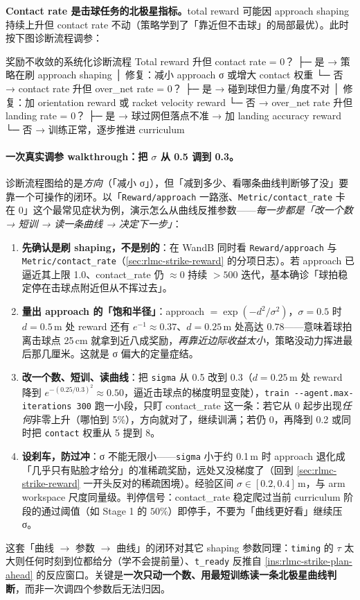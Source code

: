 \textbf{Contact rate 是击球任务的北极星指标。}total reward 可能因 approach shaping 持续上升但 contact rate 不动（策略学到了「靠近但不击球」的局部最优）。此时按下图诊断流程调参：

\begin{codebox}[text]{奖励不收敛的系统化诊断流程}
Total reward 升但 contact rate = 0？
  ├─ 是 → 策略在刷 approach shaping
  │        修复：减小 approach σ 或增大 contact 权重
  └─ 否 → contact rate 升但 over_net rate = 0？
           ├─ 是 → 碰到球但力量/角度不对
           │        修复：加 orientation reward 或 racket velocity reward
           └─ 否 → over_net rate 升但 landing rate = 0？
                    ├─ 是 → 球过网但落点不准 → 加 landing accuracy reward
                    └─ 否 → 训练正常，逐步推进 curriculum
\end{codebox}

\paragraph{一次真实调参 walkthrough：把 \texorpdfstring{$\sigma$}{sigma} 从 0.5 调到 0.3。}诊断流程图给的是\emph{方向}（「减小 σ」），但「减到多少、看哪条曲线判断够了没」要靠一个可操作的闭环。以「\verb|Reward/approach| 一路涨、\verb|Metric/contact_rate| 卡在 0」这个最常见症状为例，演示怎么从曲线反推参数——\emph{每一步都是「改一个数 → 短训 → 读一条曲线 → 决定下一步」}：
\begin{enumerate}
  \item \textbf{先确认是刷 shaping，不是别的}：在 WandB 同时看 \verb|Reward/approach| 与 \verb|Metric/contact_rate|（\cref{sec:rlmc-strike-reward} 的分项日志）。若 approach 已逼近其上限 1.0、contact\_rate 仍 $\approx 0$ 持续 $>500$ 迭代，基本确诊「球拍稳定停在击球点附近但从不挥过去」。
  \item \textbf{量出 approach 的「饱和半径」}：approach $=\exp(-d^2/\sigma^2)$，$\sigma=0.5$ 时 $d=0.5$\,m 处 reward 还有 $e^{-1}\approx0.37$、$d=0.25$\,m 处高达 $0.78$——意味着球拍离击球点 25\,cm 就拿到近八成奖励，\emph{再靠近边际收益太小}，策略没动力挥进最后那几厘米。这就是 σ 偏大的定量症结。
  \item \textbf{改一个数、短训、读曲线}：把 \verb|sigma| 从 0.5 改到 0.3（$d=0.25$\,m 处 reward 降到 $e^{-(0.25/0.3)^2}\approx0.50$，逼近击球点的梯度明显变陡），\verb|train --agent.max-iterations 300| 跑一小段，只盯 contact\_rate 这一条：若它从 0 起步出现\emph{任何}非零上升（哪怕到 5\%），方向就对了，继续训满；若仍 0，再降到 0.2 或同时把 \verb|contact| 权重从 5 提到 8。
  \item \textbf{设刹车，防过冲}：σ 不能无限小——\verb|sigma| 小于约 0.1\,m 时 approach 退化成「几乎只有贴脸才给分」的准稀疏奖励，远处又没梯度了（回到 \cref{sec:rlmc-strike-reward} 一开头反对的稀疏困境）。经验区间 $\sigma\in[0.2,0.4]$\,m，与 arm workspace 尺度同量级。判停信号：contact\_rate 稳定爬过当前 curriculum 阶段的通过阈值（如 Stage 1 的 $50\%$）即停手，不要为「曲线更好看」继续压 σ。
\end{enumerate}
\noindent{}这套「曲线 $\to$ 参数 $\to$ 曲线」的闭环对其它 shaping 参数同理：\verb|timing| 的 $\tau$ 太大则任何时刻到位都给分（学不会提前量）、\verb|t_ready| 反推自 \cref{ins:rlmc-strike-plan-ahead} 的反应窗口。关键是\textbf{一次只动一个数、用最短训练读一条北极星曲线判断}，而非一次调四个参数后无法归因。

